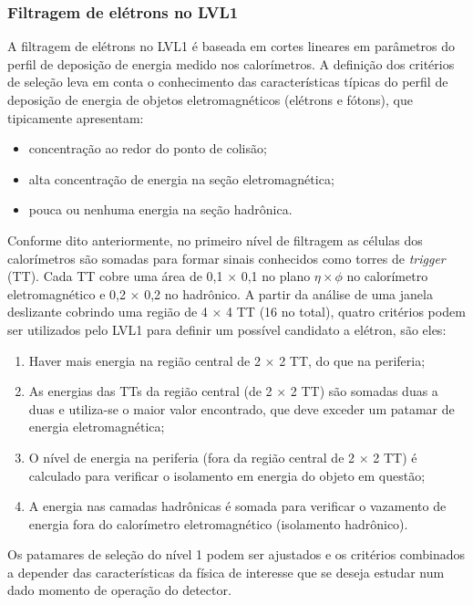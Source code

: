 \subsubsection{Filtragem de elétrons no LVL1}

A filtragem de elétrons no LVL1 é baseada em cortes lineares em
parâmetros do perfil de deposição de energia medido nos
calorímetros. A definição dos critérios de seleção leva em conta o
conhecimento das características típicas do perfil de deposição de
energia de objetos eletromagnéticos (elétrons e fótons), que
tipicamente apresentam:
\begin{itemize}
  \item concentração ao redor do ponto de colisão;
  \item alta concentração de energia na seção eletromagnética;
  \item pouca ou nenhuma energia na seção hadrônica.
\end{itemize}

Conforme dito anteriormente, no primeiro nível de filtragem as
células dos calorímetros são somadas para formar sinais conhecidos
como torres de \textit{trigger} (TT). Cada TT cobre uma área de 0,1
$\times$ 0,1 no plano $\eta \times \phi$ no calorímetro
eletromagnético e 0,2 $\times$ 0,2 no hadrônico. A partir da análise
de uma janela deslizante cobrindo uma região de 4 $\times$ 4 TT (16
no total), quatro critérios podem ser utilizados pelo LVL1 para
definir um possível candidato a elétron, são eles:
\begin{enumerate}
  \item Haver mais energia na região central de 2 $\times$ 2 TT, do
  que na periferia;
  \item As energias das TTs da região central (de 2 $\times$ 2 TT)
  são somadas duas a duas e utiliza-se o maior valor encontrado, que deve exceder um patamar de energia eletromagnética;
  \item O nível de energia na periferia (fora da região central de 2 $\times$ 2
  TT) é calculado para verificar o isolamento em energia do objeto
  em questão;
  \item A energia nas camadas hadrônicas é somada para verificar o
  vazamento de energia fora do calorímetro eletromagnético (isolamento hadrônico).
\end{enumerate}
Os patamares de seleção do nível 1 podem ser ajustados e os
critérios combinados a depender das características da física de
interesse que se deseja estudar num dado momento de operação do
detector.

